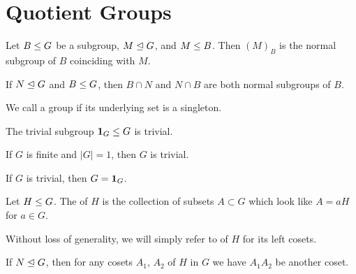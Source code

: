 \section{Quotient Groups}

\begin{definition}
Let $B\leq G$ be a subgroup, $M\trianglelefteq G$, and $M\leq B$.
Then $(M)_{B}$ is the normal subgroup of $B$ coinciding with $M$.
\end{definition}

\begin{theorem}
If $N\trianglelefteq G$ and $B\leq G$, then $B\cap N$ and $N\cap B$
are both normal subgroups of $B$.
\end{theorem}

\begin{definition}
We call a group  if its underlying set is a singleton.
\end{definition}

\begin{theorem}
The trivial subgroup $\mathbf{1}_{G}\leq G$ is trivial.
\end{theorem}

\begin{theorem}
If $G$ is finite and $|G|=1$, then $G$ is trivial.
\end{theorem}

\begin{theorem}
If $G$ is trivial, then $G=\mathbf{1}_{G}$.
\end{theorem}

\begin{definition}
Let $H\leq G$. The  of $H$ is the collection of
subsets $A\subset G$ which look like $A = aH$ for $a\in G$.
\end{definition}

\begin{def-remark}
Without loss of generality, we will simply refer to  of
$H$ for its left cosets.
\end{def-remark}

\begin{theorem}
If $N\trianglelefteq G$, then for any cosets $A_{1}$, $A_{2}$ of $H$ in
$G$ we have $A_{1}A_{2}$ be another coset.
\end{theorem}

